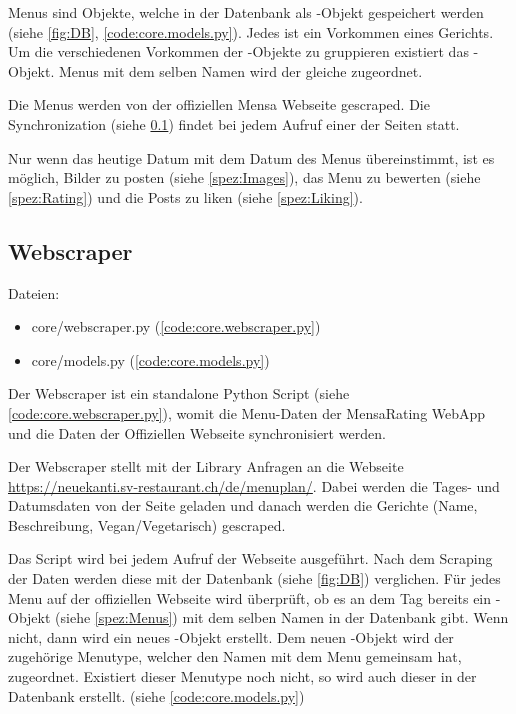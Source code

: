 Menus sind Objekte, welche in der Datenbank als -Objekt gespeichert
werden (siehe \ref{fig:DB}, \ref{code:core.models.py}). Jedes  ist
ein Vorkommen eines Gerichts. Um die verschiedenen Vorkommen der
-Objekte zu gruppieren existiert das -Objekt.
Menus mit dem selben Namen wird der gleiche  zugeordnet. 

Die Menus werden von der offiziellen Mensa Webseite gescraped. Die
Synchronization (siehe \ref{spez:Webscraper}) findet bei jedem Aufruf einer der
Seiten statt.

Nur wenn das heutige Datum mit dem Datum des Menus übereinstimmt, ist es
möglich, Bilder zu posten (siehe \ref{spez:Images}), das Menu zu bewerten (siehe
\ref{spez:Rating}) und die Posts zu liken (siehe \ref{spez:Liking}).

\subsection{Webscraper} \label{spez:Webscraper}
 
Dateien:
\begin{itemize}
    \item core/webscraper.py (\ref{code:core.webscraper.py})
    \item core/models.py (\ref{code:core.models.py})
\end{itemize}

Der Webscraper ist ein standalone Python Script (siehe
\ref{code:core.webscraper.py}), womit die Menu-Daten der MensaRating WebApp und
die Daten der Offiziellen Webseite synchronisiert werden. 

Der Webscraper stellt mit der Library  Anfragen an die Webseite
\url{https://neuekanti.sv-restaurant.ch/de/menuplan/}. Dabei werden die Tages-
und Datumsdaten von der Seite geladen und danach werden die Gerichte (Name,
Beschreibung, Vegan/Vegetarisch) gescraped.

Das Script wird bei jedem Aufruf der Webseite ausgeführt. Nach dem Scraping der
Daten werden diese mit der Datenbank (siehe \ref{fig:DB}) verglichen. Für jedes
Menu auf der offiziellen Webseite wird überprüft, ob es an dem Tag bereits ein
-Objekt (siehe \ref{spez:Menus}) mit dem selben Namen in der
Datenbank gibt. Wenn nicht, dann wird ein neues -Objekt erstellt. Dem
neuen -Objekt wird der zugehörige Menutype, welcher den Namen mit dem
Menu gemeinsam hat, zugeordnet. Existiert dieser Menutype noch nicht, so wird
auch dieser in der Datenbank erstellt. (siehe \ref{code:core.models.py})

